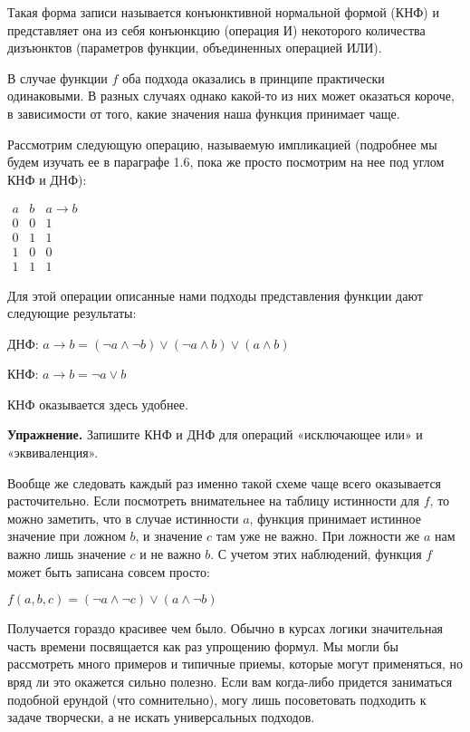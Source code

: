 Такая форма записи называется конъюнктивной нормальной формой (КНФ) и представляет она из себя конъюнкцию (операция И) некоторого количества дизъюнктов (параметров функции, объединенных операцией ИЛИ).

В случае функции $f$ оба подхода оказались в принципе практически одинаковыми. В разных случаях однако какой-то из них может оказаться короче, в зависимости от того, какие значения наша функция принимает чаще.

Рассмотрим следующую операцию, называемую импликацией (подробнее мы будем изучать ее в параграфе 1.6, пока же просто посмотрим на нее под углом КНФ и ДНФ):

$\begin{array}{cc|c}a&b&a\rightarrow b\\ \hline 0&0&1 \\ 0&1&1 \\ 1&0&0 \\ 1&1&1\end{array}$

Для этой операции описанные нами подходы представления функции дают следующие результаты:

ДНФ: $a \rightarrow b = (\neg a\wedge \neg b)\vee(\neg a \wedge b)\vee(a\wedge b)$

КНФ: $a\rightarrow b = \neg a \vee b$

КНФ оказывается здесь удобнее.

{\bfseries Упражнение.} Запишите КНФ и ДНФ для операций «исключающее или» и «эквиваленция».

Вообще же следовать каждый раз именно такой схеме чаще всего оказывается расточительно. Если посмотреть внимательнее на таблицу истинности для $f$, то можно заметить, что в случае истинности $a$, функция принимает истинное значение при ложном $b$, и значение $c$ там уже не важно. При ложности же $a$ нам важно лишь значение $c$ и не важно $b$. С учетом этих наблюдений, функция $f$ может быть записана совсем просто:

$f(a, b, c) = (\neg a\wedge \neg c) \vee (a \wedge \neg b)$

Получается гораздо красивее чем было. Обычно в курсах логики значительная часть времени посвящается как раз упрощению формул. Мы могли бы рассмотреть много примеров и типичные приемы, которые могут применяться, но вряд ли это окажется сильно полезно. Если вам когда-либо придется заниматься подобной ерундой (что сомнительно), могу лишь посоветовать подходить к задаче творчески, а не искать универсальных подходов.

